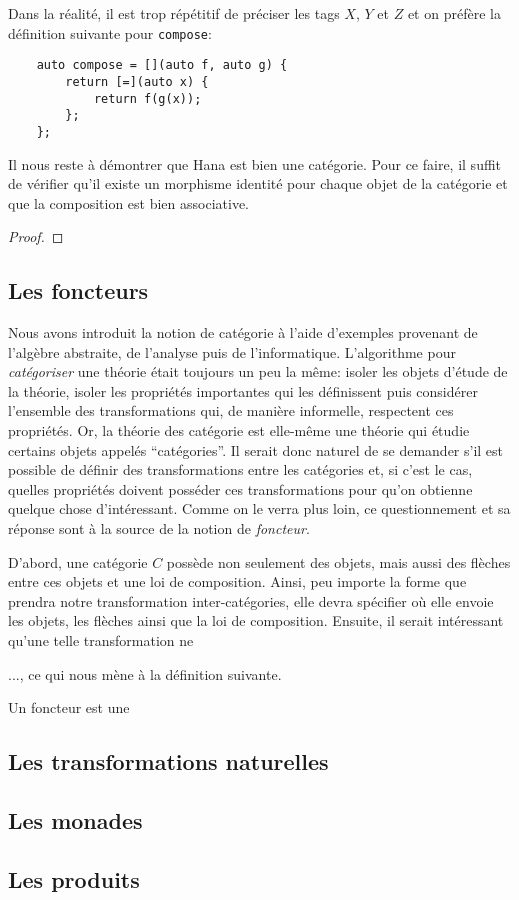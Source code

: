 Dans la réalité, il est trop répétitif de préciser les tags $X$, $Y$ et $Z$
et on préfère la définition suivante pour {\tt compose}:
\begin{verbatim}
    auto compose = [](auto f, auto g) {
        return [=](auto x) {
            return f(g(x));
        };
    };
\end{verbatim}

Il nous reste à démontrer que Hana est bien une catégorie. Pour ce faire, il
suffit de vérifier qu'il existe un morphisme identité pour chaque objet de
la catégorie et que la composition est bien associative.

\begin{proof}

\end{proof}


\subsection{Les foncteurs}
Nous avons introduit la notion de catégorie à l'aide d'exemples provenant de
l'algèbre abstraite, de l'analyse puis de l'informatique. L'algorithme pour
\textit{catégoriser} une théorie était toujours un peu la même: isoler les
objets d'étude de la théorie, isoler les propriétés importantes qui les
définissent puis considérer l'ensemble des transformations qui, de manière
informelle, respectent ces propriétés. Or, la théorie des catégorie est
elle-même une théorie qui étudie certains objets appelés ``catégories''.
Il serait donc naturel de se demander s'il est possible de définir des
transformations entre les catégories et, si c'est le cas, quelles propriétés
doivent posséder ces transformations pour qu'on obtienne quelque chose
d'intéressant. Comme on le verra plus loin, ce questionnement et sa réponse
sont à la source de la notion de \textit{foncteur}.

D'abord, une catégorie $C$ possède non seulement des objets, mais aussi des
flèches entre ces objets et une loi de composition. Ainsi, peu importe la
forme que prendra notre transformation inter-catégories, elle devra spécifier
où elle envoie les objets, les flèches ainsi que la loi de composition.
Ensuite, il serait intéressant qu'une telle transformation ne



..., ce qui nous mène à la définition suivante.

\begin{définition}[Foncteur]
Un foncteur est une
\end{définition}


\subsection{Les transformations naturelles}
\subsection{Les monades}
\subsection{Les produits}
